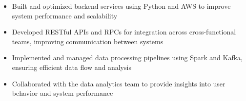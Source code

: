 \par\bigskip
{}
\par\smallskip
\begin{minipage}{13.75cm}
  \begin{minipage}{6.5cm}
    \begin{itemize}
      \item Built and optimized backend services using Python and AWS to improve system performance and scalability
      \item Developed RESTful APIs and RPCs for integration across cross-functional teams, improving communication between systems
    \end{itemize}
  \end{minipage}
  \hfill
  \begin{minipage}{6.5cm}
    \begin{itemize}
      \item Implemented and managed data processing pipelines using Spark and Kafka, ensuring efficient data flow and analysis
      \item Collaborated with the data analytics team to provide insights into user behavior and system performance
    \end{itemize}
  \end{minipage}
\end{minipage}
\par\smallskip
\divider

